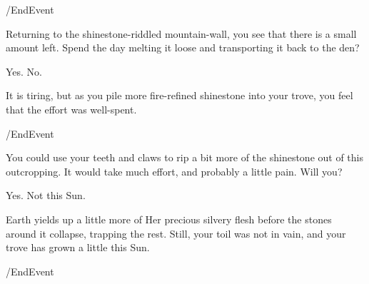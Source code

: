 \option /EndEvent  



 
Returning to the shinestone-riddled mountain-wall, you see that there is a small
amount left. Spend the day melting it loose and transporting it back to the den?

\option Yes.
	  
\option No. 

It is tiring, but as you pile more fire-refined shinestone into your trove, you
feel that the effort was well-spent.

\option /EndEvent  


 
You could use your teeth and claws to rip a bit more of the shinestone out of
this outcropping. It would take much effort, and probably a little pain. Will
you?

\option Yes.
	 
	 
\option Not this Sun.

Earth yields up a little more of Her precious silvery flesh before the stones
around it collapse, trapping the rest. Still, your toil was not in vain, and
your trove has grown a little this Sun.

\option /EndEvent  


